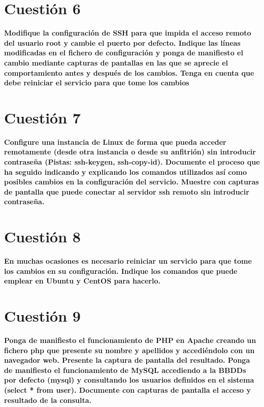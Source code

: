 \documentclass[a4paper,11pt]{article}
\newenvironment{answer}{%
\begin{list}{}{%
}%
\item[]}{\end{list}}
\begin{document}
\section{Cuestión 6}
\textbf{Modifique la configuración de SSH para que impida el acceso remoto del usuario root y cambie el puerto por defecto. 
Indique las líneas modificadas en el fichero de configuración y ponga de manifiesto el cambio mediante capturas de 
pantallas en las que se aprecie el  comportamiento antes y después de los cambios. Tenga en cuenta que debe reiniciar 
el servicio para que tome los cambios}
\begin{answer}
  
\end{answer}

\section{Cuestión 7}
\textbf{Configure una instancia de Linux de forma que pueda acceder remotamente (desde otra instancia o desde su anfitrión) 
sin introducir contraseña (Pistas: ssh-keygen, ssh-copy-id). Documente el proceso que ha seguido indicando y explicando los
comandos utilizados así como posibles cambios en la configuración del servicio. Muestre con capturas de pantalla que puede 
conectar al servidor ssh remoto sin introducir contraseña.}
\begin{answer}
  
\end{answer}

\section{Cuestión 8}
\textbf{En muchas ocasiones es necesario reiniciar un servicio para que tome los cambios en su configuración. Indique los 
comandos que puede emplear en Ubuntu y CentOS para hacerlo.}
\begin{answer}
  
\end{answer}

\section{Cuestión 9}
\textbf{Ponga de manifiesto el funcionamiento de PHP en Apache creando un fichero php que presente su nombre y apellidos 
y accediéndolo con un navegador web. Presente la captura de pantalla del resultado. Ponga de manifiesto el funcionamiento
de MySQL accediendo a la BBDDs por defecto (mysql) y consultando los usuarios definidos en el sistema (select * from user). 
Documente con capturas de pantalla el acceso y resultado de la consulta.}
\begin{answer}
  
\end{answer}
\end{document}
